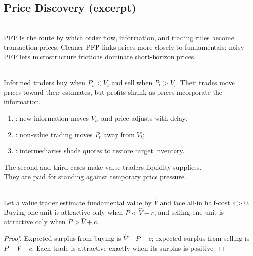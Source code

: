 \documentclass[a4paper,oneside,openany]{book}
\begin{document}
\subsection*{Price Discovery (excerpt)}

\begin{definition} \\
PFP is the route by which order flow, information, and trading rules become transaction prices. Cleaner PFP links prices more closely to fundamentals; noisy PFP lets microstructure frictions dominate short-horizon prices.
\end{definition}

\begin{mechanism} \\
Informed traders buy when $P_t<V_t$ and sell when $P_t>V_t$. Their trades move prices toward their estimates, but profits shrink as prices incorporate the information.
\end{mechanism}

\begin{taxonomy} 
\begin{enumerate}[label=\roman*.]
\setlength{\itemsep}{0pt}
\item {}: new information moves $V_t$, and price adjusts with delay;
\item {}: non-value trading moves $P_t$ away from $V_t$;
\item {}: intermediaries shade quotes to restore target inventory.
\end{enumerate}
The second and third cases make value traders liquidity suppliers.\\
They are paid for standing against temporary price pressure.
\end{taxonomy}

\begin{proposition} \\
Let a value trader estimate fundamental value by $\widehat{V}$ and face all-in half-cost $c>0$. Buying one unit is attractive only when $P<\widehat{V}-c$, and selling one unit is attractive only when $P>\widehat{V}+c$.
\begin{proof}
Expected surplus from buying is $\widehat{V}-P-c$; expected surplus from selling is $P-\widehat{V}-c$. Each trade is attractive exactly when its surplus is positive.
\end{proof}
\end{proposition}
\end{document}
